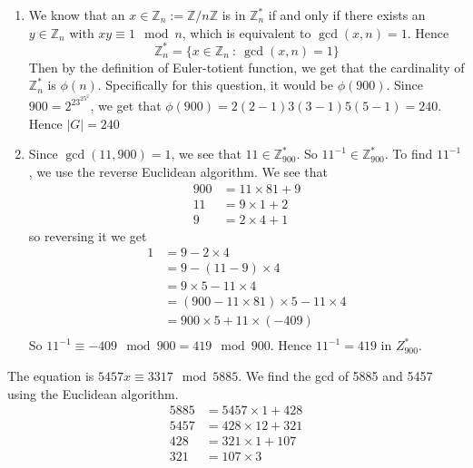 \documentclass[12pt]{exam}
\theoremstyle{plain} %
\theoremstyle{definition} %
\theoremstyle{remark} %
\begin{document}
\begin{questions}
  \question
  \begin{solution}
    \begin{enumerate}[label=(\alph*)]
       \item We know that an $x \in \mathbb{Z}_n := \mathbb{Z}/n\mathbb{Z}$ is in $\mathbb{Z}_n^{*}$ if and only if there exists an $y \in \mathbb{Z}_n$ with $xy\equiv1\mod n$, which is equivalent to $\gcd(x, n) = 1$. Hence $$\mathbb{Z}_n^{*} = \{ x \in \mathbb{Z}_n  \ : \ \gcd(x, n) = 1  \}$$
         Then by the definition of Euler-totient function, we get that the cardinality of $\mathbb{Z}_n^{*}$ is $\phi(n)$. Specifically for this question, it would be $\phi(900)$. Since $900 = 2^23^25^2$, we get that $ \phi(900) = 2(2-1)3(3-1)5(5-1) = 240$. Hence $|G| = 240$

       \item Since $\gcd(11, 900) = 1$, we see that $11 \in \mathbb{Z}_{900}^{*}$. So $11^{-1} \in \mathbb{Z}_{900}^{*}$. To find $11^{-1}$, we use the reverse Euclidean algorithm. We see that \begin{align*}
           900 &= 11\times81 + 9 \\ 
           11 &= 9\times1 + 2 \\ 
           9 & = 2\times4 + 1
       \end{align*}
       so reversing it we get \begin{align*}
         1 &= 9 - 2\times4 \\ 
         & = 9 - (11 - 9)\times 4 \\ 
         & = 9\times5 - 11\times4 \\ 
         & = (900 - 11 \times 81) \times 5 - 11 \times 4 \\ 
         & = 900\times 5 + 11 \times (-409) \\
       \end{align*}
      So $11^{-1} \equiv -409 \mod 900 = 419 \mod 900$. Hence $11^{-1} = 419$ in $Z_{900}^{*}$. 
     \end{enumerate}
  \end{solution}


  \question
  \begin{solution}
    The equation is $5457x \equiv 3317 \mod 5885$. We find the gcd of 5885 and 5457 using the Euclidean algorithm. \begin{align*}
      5885 &= 5457 \times 1 + 428 \\ 
      5457 &= 428\times 12 + 321 \\ 
      428 &= 321\times1 + 107 \\ 
      321 &= 107\times3
    \end{align*}


\end{solution}
\end{questions}
\end{document}
